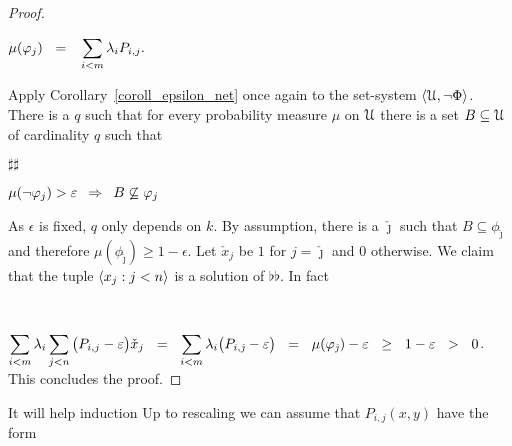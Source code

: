 \documentclass[sputnik.tex]{subfiles}
\begin{document}
\begin{proof}
\parbox{10ex}{~}
$\displaystyle\mu(\phi_j)\medrel{=}\sum_{i<m}\lambda_i P_{i,j}.$

Apply Corollary~\ref{coroll_epsilon_net} once again to the set-system $\langle\EuScript U,\neg\Phi\rangle$.
There is a $q$ such that for every probability measure $\mu$ on $\EuScript U$ there is a set $B\subseteq\EuScript U$ of cardinality $q$ such that

\parbox{10ex}{$\sharp\sharp$}
$\displaystyle\mu(\neg\phi_j)>\epsilon\medrel{\IMP}B\not\subseteq\phi_j$

As $\epsilon$ is fixed, $q$ only depends on $k$.
By assumption, there is a $\check\jmath$ such that $B\subseteq\phi_{\check\jmath}$ and therefore $\mu(\phi_{\check\jmath})\ge1-\epsilon$.
Let $\check x_j$ be $1$ for $j=\check\jmath$ and $0$ otherwise.
We claim that the tuple $\langle x_j:j<n\rangle$ is a solution of $\flat\flat$.
In fact

\parbox{10ex}{~}
$\displaystyle\sum_{i<m}\lambda_i\sum_{j<n}\big(P_{i,j}-\epsilon\big)\check x_j\medrel{=}{\sum_{i<m}\lambda_i\big(P_{i,\check\jmath}-\epsilon\big)}\medrel{=}\mu(\phi_{\check\jmath})-\epsilon\medrel{\ge}1-\epsilon\medrel{>}0$.
This concludes the proof.
\end{proof}

% 
It will help induction 
% 
% 
Up to rescaling we can assume that $P_{i,j}(x,y)$ have the form 
% 
% 
% 
% 
% 
% 
\end{document}
